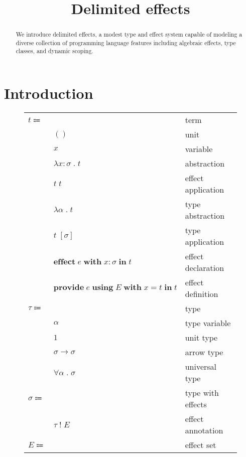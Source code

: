 \documentclass[12pt]{article}
\title{Delimited effects}
\date{}
\newcommand\eterm{t}
\newcommand\eunit{()}
\newcommand\evar{x}
\newcommand\eabs[2]{\lambda #1 \; . \; #2} %
\newcommand\eapp[2]{#1 \; #2}
\newcommand\eeffect[4]{\textbf{effect} \; #1 \; \textbf{with} \; \tanno{#2}{#3} \; \textbf{in} \; #4}
\newcommand\eprovide[5]{\textbf{provide} \; #1 \; \textbf{using} \; #2 \; \textbf{with} \; #3 = #4 \; \textbf{in} \; #5}
\newcommand\etabs[2]{\lambda #1 \; . \; #2} %
\newcommand\etapp[2]{#1 \; \left[#2\right]}
\newcommand\ttype{\tau}
\newcommand\tunit{1}
\newcommand\tvar{\alpha}
\newcommand\tarrow[2]{#1 \rightarrow #2} %
\newcommand\tanno[2]{#1 : #2} %
\newcommand\tx{\sigma}
\newcommand\twithx[2]{#1 \; ! \; #2} %
\newcommand\tforall[2]{\forall #1 \; . \; #2} %
\newcommand\xeffect{e}
\newcommand\xeffects{E}
\begin{document}
  \maketitle

  \begin{abstract}
    We introduce delimited effects, a modest type and effect system capable of modeling a diverse collection of programming language features including algebraic effects, type classes, and dynamic scoping.
  \end{abstract}

  \section{Introduction}

  \begin{figure}
    \begin{mdframed}[backgroundcolor=none]
      \begin{center}
        \begin{tabular}{l l l}
          $\eterm \Coloneqq $ & & term \\
          & $\eunit$ & unit \\
          & $\evar$ & variable \\
          & $\eabs{\tanno{\evar}{\tx}}{\eterm}$ & abstraction \\
          & $\eapp{\eterm}{\eterm}$ & effect application \\
          & $\etabs{\tvar}{\eterm}$ & type abstraction \\
          & $\etapp{\eterm}{\tx}$ & type application \\
          & $\eeffect{\xeffect}{\evar}{\tx}{\eterm}$ & effect declaration \\
          & $\eprovide{\xeffect}{\xeffects}{\evar}{\eterm}{\eterm}$ & effect definition \\
          $\ttype \Coloneqq$ & & type \\
          & $\tvar$ & type variable \\
          & $\tunit$ & unit type \\
          & $\tarrow{\tx}{\tx}$ & arrow type \\
          & $\tforall{\tvar}{\tx}$ & universal type \\
          $\tx \Coloneqq$ & & type with effects \\
          & $\twithx{\ttype}{\xeffects}$ & effect annotation \\
          $\xeffects \Coloneqq$ & & effect set \\

\end{tabular}
\end{center}
\end{mdframed}
\end{figure}
\end{document}
